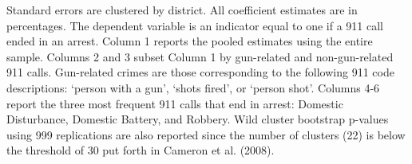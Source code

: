 \begin{table}[H]
\begin{threeparttable}
\begin{tablenotes}
\item Standard errors are clustered by district. All                      coefficient estimates are in percentages.                      The dependent variable is an indicator equal to one if a 911 call ended in an arrest.                      Column 1 reports the pooled estimates using the entire sample.                  Columns 2 and 3 subset Column 1 by gun-related and non-gun-related 911 calls.                  Gun-related crimes are those corresponding to the following                  911 code descriptions: `person with a gun',                  `shots fired', or `person shot'.                   Columns 4-6 report the three most frequent 911 calls that end in arrest: Domestic Disturbance,                  Domestic Battery, and Robbery. Wild cluster bootstrap p-values using 999 replications are also reported                  since the number of clusters (22) is below the threshold of 30 put forth in                  Cameron et al. (2008).                  
\end{tablenotes}
\end{threeparttable}
\end{table}
